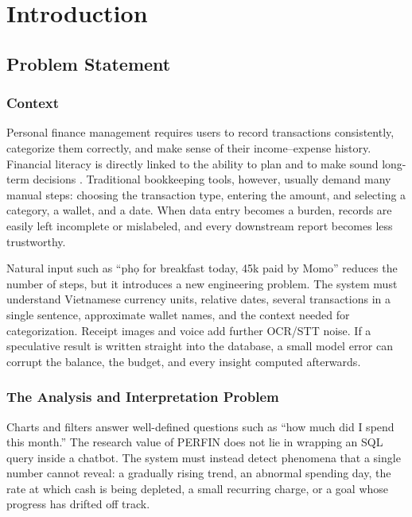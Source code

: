 \chapter{Introduction}
\label{chap:introduction}

\section{Problem Statement}

\subsection{Context}

Personal finance management requires users to record transactions
consistently, categorize them correctly, and make sense of their
income--expense history. Financial literacy is directly linked to the
ability to plan and to make sound long-term decisions
\cite{lusardi2014}. Traditional bookkeeping tools, however, usually
demand many manual steps: choosing the transaction type, entering the
amount, and selecting a category, a wallet, and a date. When data entry
becomes a burden, records are easily left incomplete or mislabeled, and
every downstream report becomes less trustworthy.

Natural input such as ``ph\d{o} for breakfast today, 45k paid by Momo''
reduces the number of steps, but it introduces a new engineering
problem. The system must understand Vietnamese currency units, relative
dates, several transactions in a single sentence, approximate wallet
names, and the context needed for categorization. Receipt images and
voice add further OCR/STT noise. If a speculative result is written
straight into the database, a small model error can corrupt the
balance, the budget, and every insight computed afterwards.

\subsection{The Analysis and Interpretation Problem}

Charts and filters answer well-defined questions such as ``how much did
I spend this month.'' The research value of PERFIN does not lie in
wrapping an SQL query inside a chatbot. The system must instead detect
phenomena that a single number cannot reveal: a gradually rising trend,
an abnormal spending day, the rate at which cash is being depleted, a
small recurring charge, or a goal whose progress has drifted off track.

